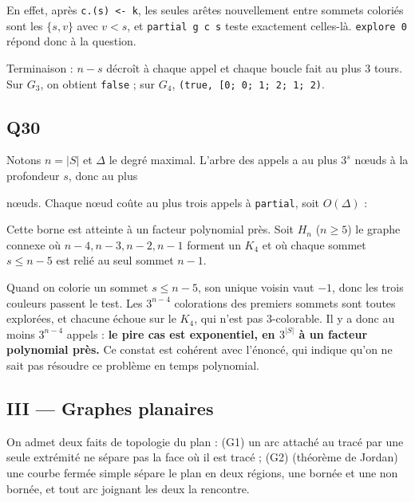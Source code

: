 \documentclass[11pt,a4paper]{article}
\newcommand{\equationajustee}[1]{%
  \sbox{\boiteequation}{$\displaystyle #1$}%
  \ifdim\wd\boiteequation>\linewidth
    \[\resizebox{\linewidth}{!}{\usebox{\boiteequation}}\]%
  \else
    \[#1\]%
  \fi}
\begin{document}
En effet, après \texttt{c.(s)\ \textless{}-\ k}, les seules arêtes nouvellement entre sommets coloriés sont les \(\{s, v\}\) avec \(v < s\), et \texttt{partial\ g\ c\ s} teste exactement celles-là. \texttt{explore\ 0} répond donc à la question.

Terminaison : \(n - s\) décroît à chaque appel et chaque boucle fait au plus 3 tours. Sur \(G_3\), on obtient \texttt{false} ; sur \(G_4\), \texttt{(\allowbreak{}true,\allowbreak{}\ {[}\textbar{}0;\allowbreak{}\ 0;\allowbreak{}\ 1;\allowbreak{}\ 2;\allowbreak{}\ 1;\allowbreak{}\ 2\textbar{}{]}\allowbreak{})\allowbreak{}}.

\hypertarget{q30}{%
\subsection{Q30}\label{q30}}

Notons \(n = |S|\) et \(\Delta\) le degré maximal. L'arbre des appels a au plus \(3^s\) nœuds à la profondeur \(s\), donc au plus

\equationajustee{\sum_{s=0}^{n} 3^s = \frac{3^{n+1} - 1}{2}}

nœuds. Chaque nœud coûte au plus trois appels à \texttt{partial}, soit \(O(\Delta)\) :

\equationajustee{\boxed{\,C_{\text{pire}} = O\big(\Delta\, 3^{|S|}\big) = O\big(|S|\, 3^{|S|}\big)\,}}

Cette borne est atteinte à un facteur polynomial près. Soit \(H_n\) (\(n \ge 5\)) le graphe connexe où \(n-4, n-3, n-2, n-1\) forment un \(K_4\) et où chaque sommet \(s \le n-5\) est relié au seul sommet \(n-1\).

Quand on colorie un sommet \(s \le n-5\), son unique voisin vaut \(-1\), donc les trois couleurs passent le test. Les \(3^{n-4}\) colorations des premiers sommets sont toutes explorées, et chacune échoue sur le \(K_4\), qui n'est pas 3-colorable. Il y a donc au moins \(3^{n-4}\) appels : \textbf{le pire cas est exponentiel, en \(3^{|S|}\) à un facteur polynomial près.} Ce constat est cohérent avec l'énoncé, qui indique qu'on ne sait pas résoudre ce problème en temps polynomial.

\hypertarget{iii-graphes-planaires}{%
\subsection{III --- Graphes planaires}\label{iii-graphes-planaires}}

On admet deux faits de topologie du plan : (G1) un arc attaché au tracé par une seule extrémité ne sépare pas la face où il est tracé ; (G2) (théorème de Jordan) une courbe fermée simple sépare le plan en deux régions, une bornée et une non bornée, et tout arc joignant les deux la rencontre.
\end{document}
